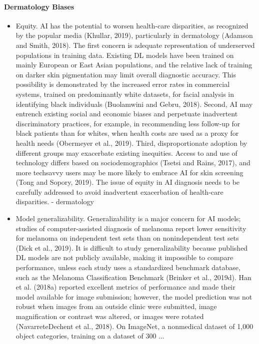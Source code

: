 \documentclass[12pt, a4paper, oneside]{book}   	%
\begin{document}
			\paragraph{Dermatology Biases}
			\begin{itemize}
				\item Equity. AI has the potential to worsen health-care disparities, as recognized by the popular media (Khullar, 2019), particularly in dermatology (Adamson and Smith, 2018). The first concern is adequate representation of underserved populations in training data. Existing DL models have been trained on mainly European or East Asian populations, and the relative lack of training on darker skin pigmentation may limit overall diagnostic accuracy. This possibility is demonstrated by the increased error rates in commercial systems, trained on predominantly white datasets, for facial analysis in identifying black individuals (Buolamwini and Gebru, 2018). Second, AI may entrench existing social and economic biases and perpetuate inadvertent discriminatory practices, for example, in recommending less follow-up for black patients than for whites, when health costs are used as a proxy for health needs (Obermeyer et al., 2019). Third, disproportionate adoption by different groups may exacerbate existing inequities. Access to and use of technology differs based on sociodemographics (Tsetsi and Rains, 2017), and more techsavvy users may be more likely to embrace AI for skin screening (Tong and Sopory, 2019). The issue of equity in AI diagnosis needs to be carefully addressed to avoid inadvertent exacerbation of health-care disparities. \autocite{Young_2020} - dermatology
				\item Model generalizability. Generalizability is a major concern for AI models; studies of computer-assisted diagnosis of melanoma report lower sensitivity for melanoma on independent test sets than on nonindependent test sets (Dick et al., 2019). It is difficult to study generalizability because published DL models are not publicly available, making it impossible to compare performance, unless each study uses a standardized benchmark database, such as the Melanoma Classification Benchmark (Brinker et al., 2019d). Han et al. (2018a) reported excellent metrics of performance and made their model available for image submission; however, the model prediction was not robust when images from an outside clinic were submitted, image magnification or contrast was altered, or images were rotated (NavarreteDechent et al., 2018). On ImageNet, a nonmedical dataset of 1,000 object categories, training on a dataset of 300 ... \autocite{Young_2020}
			\end{itemize}
\end{document}
